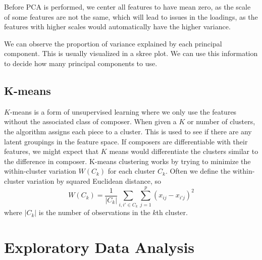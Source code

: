 \documentclass[12pt,twoside]{reedthesis}
\theoremstyle{definition}
\theoremstyle{definition}
\theoremstyle{definition}
\theoremstyle{remark}
\begin{document}
Before PCA is performed, we center all features to have mean zero, as
the scale of some features are not the same, which will lead to issues
in the loadings, as the features with higher scales would automatically
have the higher variance.

We can observe the proportion of variance explained by each principal
component. This is usually visualized in a skree plot. We can use this
information to decide how many principal components to use.

\section{K-means}\label{k-means}

\(K\)-means is a form of unsupervised learning where we only use the
features without the associated class of composer. When given a \(K\) or
number of clusters, the algorithm assigns each piece to a cluster. This
is used to see if there are any latent groupings in the feature space.
If composers are differentiable with their features, we might expect
that \(K\) means would differentiate the clusters similar to the
difference in composer. K-means clustering works by trying to minimize
the within-cluster variation \(W(C_k)\) for each cluster \(C_k\). Often
we define the within-cluster variation by squared Euclidean distance, so
\[W(C_k) = \frac{1}{|C_k|} \sum_{i,i' \in C_k}\sum_{j = 1}^p (x_{ij} - x_{i'j})^2 \]
where \(|C_k|\) is the number of observations in the \(k\)th cluster.

\chapter{Exploratory Data Analysis}\label{exploratory-data-analysis}
\end{document}

